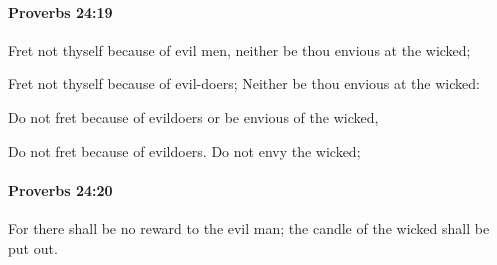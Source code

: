 		\paragraph{Proverbs 24:19} %
			\label{PROVERBS-24-19}

			Fret not thyself because of evil men, neither be thou envious at the wicked;

			\begin{versebox}
					\item[BHS] 
					\item[ASV] Fret not thyself because of evil-doers; Neither be thou envious at the wicked:
					\item[NIV] Do not fret because of evildoers or be envious of the wicked,
					\item[NRSV] Do not fret because of evildoers. Do not envy the wicked;
			\end{versebox}

		\paragraph{Proverbs 24:20} %
			\label{PROVERBS-24-20}

			For there shall be no reward to the evil man; the candle of the wicked shall be put out.

